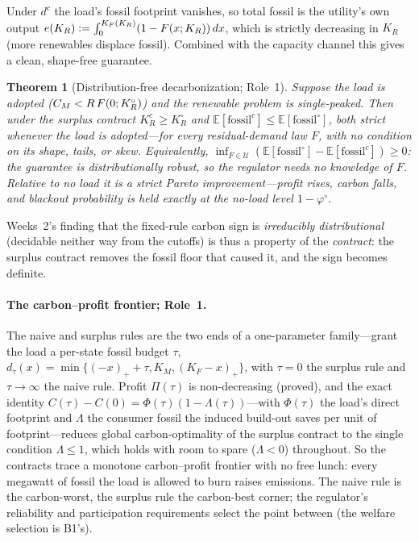 \documentclass[11pt,reqno]{amsart}
\theoremstyle{plain}
\newtheorem{theorem}{Theorem}\newtheorem{proposition}{Proposition}
\theoremstyle{definition}\newtheorem{condition}{Condition}\newtheorem{assumption}{Assumption}
\theoremstyle{remark}\newtheorem{remark}{Remark}
\newcommand{\KR}{K_R}\newcommand{\KF}{K_F}\newcommand{\KM}{K_M}
\newcommand{\KRo}{K_R^{\circ}}\newcommand{\KFo}{K_F^{\circ}}
\newcommand{\E}{\mathbb{E}}\newcommand{\PP}{\mathbb{P}}\newcommand{\eqdef}{\vcentcolon=}
\newcommand{\Ucal}{\mathcal U}
\begin{document}
Under $d^{c}$ the load's fossil footprint vanishes, so total fossil is the utility's own
output $e(\KR)\eqdef\int_0^{\KF(\KR)}(1-F(x;\KR))\,dx$, which is strictly decreasing in
$\KR$ (more renewables displace fossil). Combined with the capacity channel this gives a
clean, shape-free guarantee.

\begin{theorem}[Distribution-free decarbonization; Role~1]\label{thm:decarb}
Suppose the load is adopted ($\CM<R\,F(0;\KRo)$) and the renewable problem is
single-peaked. Then under the surplus contract $K_R^{c}\ge\KRo$ and
$\E[\text{fossil}^{c}]\le\E[\text{fossil}^{\circ}]$, both strict whenever the load is
adopted---\emph{for every residual-demand law $F$}, with no condition on its shape, tails,
or skew. Equivalently, $\inf_{F\in\Ucal}(\E[\text{fossil}^{\circ}]-\E[\text{fossil}^{c}])\ge0$:
the guarantee is distributionally robust, so the regulator needs no knowledge of $F$.
Relative to no load it is a strict Pareto improvement---profit rises, carbon falls, and
blackout probability is held exactly at the no-load level $1-\varphi^{\circ}$.
\end{theorem}

Weeks~2's finding that the fixed-rule carbon sign is \emph{irreducibly distributional}
(decidable neither way from the cutoffs) is thus a property of the \emph{contract}: the
surplus contract removes the fossil floor that caused it, and the sign becomes definite.

\paragraph{The carbon--profit frontier; Role~1.} The naive and surplus rules are the two
ends of a one-parameter family---grant the load a per-state fossil budget $\tau$,
$d_{\tau}(x)=\min\{(-x)_++\tau,\KM,(\KF-x)_+\}$, with $\tau=0$ the surplus rule and
$\tau\to\infty$ the naive rule. Profit $\Pi(\tau)$ is non-decreasing (proved), and the
exact identity $C(\tau)-C(0)=\Phi(\tau)(1-\Lambda(\tau))$---with $\Phi(\tau)$ the load's
direct footprint and $\Lambda$ the consumer fossil the induced build-out saves per unit
of footprint---reduces global carbon-optimality of the surplus contract to the single
condition $\Lambda\le1$, which holds with room to spare ($\Lambda<0$) throughout. So the
contracts trace a monotone carbon--profit frontier with no free lunch: every megawatt of
fossil the load is allowed to burn raises emissions. The naive rule is the carbon-worst,
the surplus rule the carbon-best corner; the regulator's reliability and participation
requirements select the point between (the welfare selection is B1's).
\end{document}
